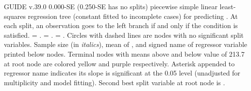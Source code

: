 \documentclass[12pt]{article}
\begin{document}
 \begin{center}
 \end{center}
GUIDE v.39.0 0.000-SE (0.250-SE has no splits)
piecewise simple linear least-squares regression tree
 (constant fitted to incomplete cases)
for predicting \texttt{}.
At each split, an observation goes to the left branch 
 if and only if the condition is satisfied.
\texttt{} = \texttt{}.
\texttt{} = \texttt{}.
\texttt{} = \texttt{}.
 Circles with dashed lines are nodes with no significant split variables.
Sample size (in \emph{italics}), mean of \texttt{}, and signed name of regressor variable printed below nodes.
 Terminal nodes with means above and below value of 213.7 at root node are colored yellow and purple respectively.
 Asterisk appended to regressor name indicates its slope is significant at the 0.05 level (unadjusted for multiplicity and model fitting).
 Second best split variable at root node is \texttt{}.
 
\end{document}

